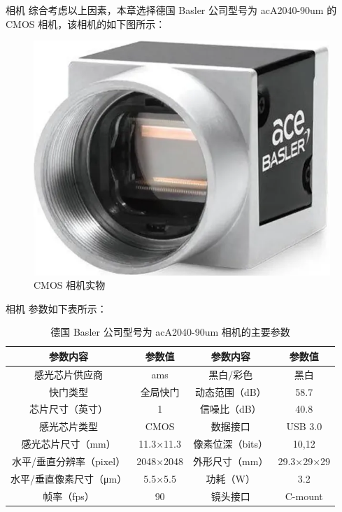 \documentclass[aspectratio=169,t,xcolor=table,10pt]{ctexbeamer}
\numberwithin{equation}{section} %
\begin{document}
	\begin{frame}[squeeze]
		\begin{block}{相机}
			\qquad 综合考虑以上因素，本章选择德国 Basler 公司型号为 acA2040-90um 的 CMOS 相机，该相机的如下图所示：
			\begin{figure}[H]
				\centering
				\includegraphics[width=0.5\linewidth]{Figure/Basler}
				\caption{CMOS 相机实物}
			\end{figure}
		\end{block}
	\end{frame}
	
	\begin{frame}[squeeze]
		\begin{block}{相机}
			\qquad 参数如下表所示：
			\begin{table}[H]
				\centering
				\caption{德国 Basler 公司型号为 acA2040-90um 相机的主要参数}
				\begin{tabular}{cc|cc}
					\toprule[1.5pt]
					参数内容 & 参数值 & 参数内容 & 参数值 \\
					\midrule[0.75pt]
					感光芯片供应商 & ams & 黑白/彩色 & 黑白 \\
					快门类型 & 全局快门 & 动态范围（dB） & 58.7 \\
					芯片尺寸（英寸） & 1 & 信噪比（dB）& 40.8 \\
					感光芯片类型 & CMOS & 数据接口 & USB 3.0  \\
					感光芯片尺寸（$\mathrm{mm}$）& 11.3×11.3 & 像素位深（bits）& 10,12 \\
					水平/垂直分辨率（pixel） & 2048×2048 & 外形尺寸（$\mathrm{mm}$） & 29.3×29×29 \\ 
					水平/垂直像素尺寸（μm） & 5.5×5.5 & 功耗（W） & 3.2 \\
					帧率（fps） & 90 & 镜头接口 &  C-mount  \\
					\bottomrule[1.5pt]
				\end{tabular}
				\label{CMOScanshu}
			\end{table}
		\end{block}
	\end{frame}
	
\end{document}
